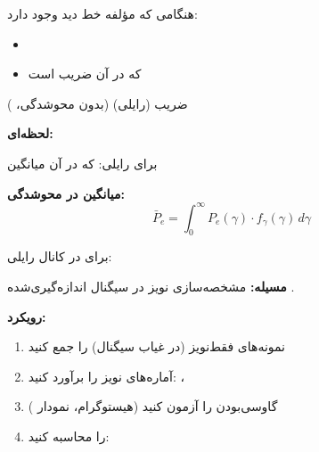 هنگامی که مؤلفه خط دید  وجود دارد:

\begin{itemize}
\tightlist
\item
\item
   که در آن  ضریب  است
\end{itemize}

ضریب  (رایلی)  (بدون محوشدگی، )


\textbf{ لحظه‌ای:} 

برای رایلی:  که در آن  میانگین

\textbf{میانگین  در محوشدگی:}\PSbr{}\[\bar{P}_e = \int_0^\infty P_e(\gamma) \cdot f_\gamma(\gamma) \, d\gamma\]

برای  در کانال رایلی: 



\textbf{مسیله:} مشخصه‌سازی نویز در سیگنال اندازه‌گیری‌شده .

\textbf{رویکرد:}

\begin{enumerate}
\def\labelenumi{\arabic{enumi}.}
\tightlist
\item
  نمونه‌های فقط‌نویز (در غیاب سیگنال) را جمع کنید
\item
  آماره‌های نویز را برآورد کنید: ، 
\item
  گاوسی‌بودن را آزمون کنید (هیستوگرام، نمودار )
\item
   را محاسبه کنید: 
\end{enumerate}

